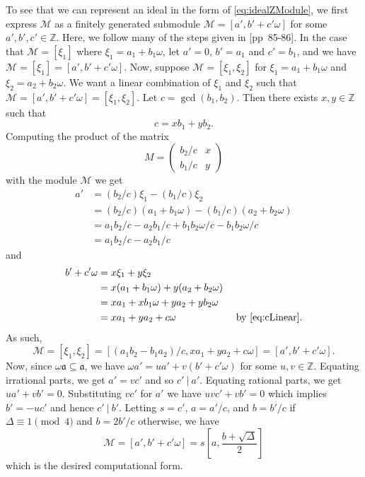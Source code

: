 \documentclass{ucalgthes1}
\theoremstyle{plain}
\theoremstyle{definition}
\newcommand{\MM}{\mathcal{M}}
\newcommand{\ZZ}{\mathbb{Z}}
\newcommand{\matrixtt}[4]{\left( \begin{array}{rr} #1 & #2 \\ #3 & #4 \end{array} \right)}
\begin{document}
To see that we can represent an ideal in the form of \eqref{eq:idealZModule}, we first express $\MM$ as a finitely generated submodule $\MM=[a',b'+c'\omega]$ for some $a',b',c' \in \ZZ$.  Here, we follow many of the steps given in \cite{Jac09}[pp~85-86].  In the case that $\MM = [\xi_1]$ where $\xi_1 = a_1+b_1\omega$, let $a'=0$, $b' = a_1$ and $c'=b_1$, and we have $\MM = [\xi_1] = [a', b'+c'\omega]$.  Now, suppose $\MM = [\xi_1, \xi_2]$ for $\xi_1 = a_1 + b_1\omega$ and $\xi_2 = a_2+b_2\omega$.  We want a linear combination of $\xi_1$ and $\xi_2$ such that $\MM = [a',b'+c'\omega] = [\xi_1, \xi_2]$.  Let $c = \gcd(b_1, b_2)$.  Then there exists $x,y \in \ZZ$ such that 
\begin{equation}
\label{eq:cLinear}
	c = xb_1 + yb_2.
\end{equation}
Computing the product of the matrix
\[
	M = \matrixtt{b_2/c}{x}{b_1/c}{y}
\]
with the module $\MM$ we get
\begin{align*}
	a' &= (b_2/c) \xi_1 - (b_1/c) \xi_2  \\
	&= (b_2/c) (a_1+b_1\omega) - (b_1/c) (a_2+b_2\omega)  \\
	&= a_1b_2/c -a_2b_1/c + b_1b_2\omega/c -b_1b_2\omega/c \\
	&= a_1b_2/c - a_2b_1/c
\end{align*}
and
\begin{align*}
	b'+c'\omega &= x\xi_1 + y\xi_2 \\
	&= x(a_1+b_1\omega) + y(a_2+b_2\omega) \\
	&= xa_1+xb_1\omega + ya_2+yb_2\omega \\
	&= xa_1 + ya_2 + c\omega & \mbox{ by \eqref{eq:cLinear}}.
\end{align*}
As such, 
\[
	\MM = [\xi_1,\xi_2] = [(a_1b_2-b_1a_2)/c, xa_1+ya_2+c\omega] = [a',b'+c'\omega].
\]
Now, since $\omega\mathfrak a \subseteq \mathfrak a$, we have $\omega a' = ua' + v(b'+c'\omega)$ for some $u,v \in \ZZ$. Equating irrational parts, we get $a' = vc'$ and so $c'~|~a'$.  Equating rational parts, we get $ua'+vb' = 0$.  Substituting $vc'$ for $a'$ we have $uvc'+vb' = 0$ which implies $b' = -uc'$ and hence $c'~|~b'$.  Letting $s=c'$, $a=a'/c$, and $b = b'/c$ if $\Delta \equiv 1 \pmod 4$ and $b = 2b'/c$ otherwise, we have
\[
	\MM = [a', b'+c'\omega] = s\left[a, \frac{b+ \sqrt{\Delta}}{2} \right]
\]
which is the desired computational form.
\end{document}

